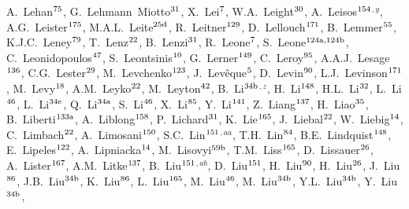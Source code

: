 \begin{flushleft}
A.~Lehan$^\textrm{\scriptsize 75}$,
G.~Lehmann~Miotto$^\textrm{\scriptsize 31}$,
X.~Lei$^\textrm{\scriptsize 7}$,
W.A.~Leight$^\textrm{\scriptsize 30}$,
A.~Leisos$^\textrm{\scriptsize 154}$$^{,y}$,
A.G.~Leister$^\textrm{\scriptsize 175}$,
M.A.L.~Leite$^\textrm{\scriptsize 25d}$,
R.~Leitner$^\textrm{\scriptsize 129}$,
D.~Lellouch$^\textrm{\scriptsize 171}$,
B.~Lemmer$^\textrm{\scriptsize 55}$,
K.J.C.~Leney$^\textrm{\scriptsize 79}$,
T.~Lenz$^\textrm{\scriptsize 22}$,
B.~Lenzi$^\textrm{\scriptsize 31}$,
R.~Leone$^\textrm{\scriptsize 7}$,
S.~Leone$^\textrm{\scriptsize 124a,124b}$,
C.~Leonidopoulos$^\textrm{\scriptsize 47}$,
S.~Leontsinis$^\textrm{\scriptsize 10}$,
G.~Lerner$^\textrm{\scriptsize 149}$,
C.~Leroy$^\textrm{\scriptsize 95}$,
A.A.J.~Lesage$^\textrm{\scriptsize 136}$,
C.G.~Lester$^\textrm{\scriptsize 29}$,
M.~Levchenko$^\textrm{\scriptsize 123}$,
J.~Lev\^eque$^\textrm{\scriptsize 5}$,
D.~Levin$^\textrm{\scriptsize 90}$,
L.J.~Levinson$^\textrm{\scriptsize 171}$,
M.~Levy$^\textrm{\scriptsize 18}$,
A.M.~Leyko$^\textrm{\scriptsize 22}$,
M.~Leyton$^\textrm{\scriptsize 42}$,
B.~Li$^\textrm{\scriptsize 34b}$$^{,z}$,
H.~Li$^\textrm{\scriptsize 148}$,
H.L.~Li$^\textrm{\scriptsize 32}$,
L.~Li$^\textrm{\scriptsize 46}$,
L.~Li$^\textrm{\scriptsize 34e}$,
Q.~Li$^\textrm{\scriptsize 34a}$,
S.~Li$^\textrm{\scriptsize 46}$,
X.~Li$^\textrm{\scriptsize 85}$,
Y.~Li$^\textrm{\scriptsize 141}$,
Z.~Liang$^\textrm{\scriptsize 137}$,
H.~Liao$^\textrm{\scriptsize 35}$,
B.~Liberti$^\textrm{\scriptsize 133a}$,
A.~Liblong$^\textrm{\scriptsize 158}$,
P.~Lichard$^\textrm{\scriptsize 31}$,
K.~Lie$^\textrm{\scriptsize 165}$,
J.~Liebal$^\textrm{\scriptsize 22}$,
W.~Liebig$^\textrm{\scriptsize 14}$,
C.~Limbach$^\textrm{\scriptsize 22}$,
A.~Limosani$^\textrm{\scriptsize 150}$,
S.C.~Lin$^\textrm{\scriptsize 151}$$^{,aa}$,
T.H.~Lin$^\textrm{\scriptsize 84}$,
B.E.~Lindquist$^\textrm{\scriptsize 148}$,
E.~Lipeles$^\textrm{\scriptsize 122}$,
A.~Lipniacka$^\textrm{\scriptsize 14}$,
M.~Lisovyi$^\textrm{\scriptsize 59b}$,
T.M.~Liss$^\textrm{\scriptsize 165}$,
D.~Lissauer$^\textrm{\scriptsize 26}$,
A.~Lister$^\textrm{\scriptsize 167}$,
A.M.~Litke$^\textrm{\scriptsize 137}$,
B.~Liu$^\textrm{\scriptsize 151}$$^{,ab}$,
D.~Liu$^\textrm{\scriptsize 151}$,
H.~Liu$^\textrm{\scriptsize 90}$,
H.~Liu$^\textrm{\scriptsize 26}$,
J.~Liu$^\textrm{\scriptsize 86}$,
J.B.~Liu$^\textrm{\scriptsize 34b}$,
K.~Liu$^\textrm{\scriptsize 86}$,
L.~Liu$^\textrm{\scriptsize 165}$,
M.~Liu$^\textrm{\scriptsize 46}$,
M.~Liu$^\textrm{\scriptsize 34b}$,
Y.L.~Liu$^\textrm{\scriptsize 34b}$,
Y.~Liu$^\textrm{\scriptsize 34b}$,

\end{flushleft}

